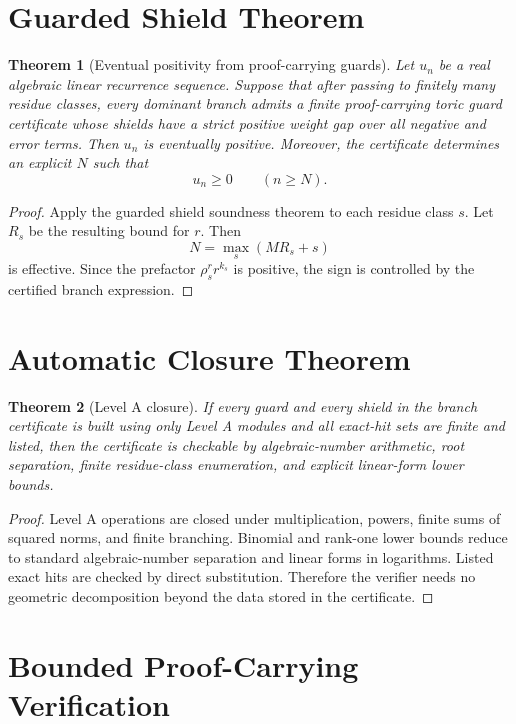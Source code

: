 \documentclass[11pt]{article}
\newtheorem{theorem}{Theorem}[section]
\begin{document}
\section{Guarded Shield Theorem}

\begin{theorem}[Eventual positivity from proof-carrying guards]
Let \(u_n\) be a real algebraic linear recurrence sequence. Suppose that after passing to finitely many residue classes, every dominant branch admits a finite proof-carrying toric guard certificate whose shields have a strict positive weight gap over all negative and error terms. Then \(u_n\) is eventually positive. Moreover, the certificate determines an explicit \(N\) such that
\[
u_n\ge0
\qquad(n\ge N).
\]
\end{theorem}

\begin{proof}
Apply the guarded shield soundness theorem to each residue class \(s\). Let \(R_s\) be the resulting bound for \(r\). Then
\[
N=\max_s(MR_s+s)
\]
is effective. Since the prefactor \(\rho_s^r r^{k_s}\) is positive, the sign is controlled by the certified branch expression.
\end{proof}

\section{Automatic Closure Theorem}

\begin{theorem}[Level A closure]
If every guard and every shield in the branch certificate is built using only Level A modules and all exact-hit sets are finite and listed, then the certificate is checkable by algebraic-number arithmetic, root separation, finite residue-class enumeration, and explicit linear-form lower bounds.
\end{theorem}

\begin{proof}
Level A operations are closed under multiplication, powers, finite sums of squared norms, and finite branching. Binomial and rank-one lower bounds reduce to standard algebraic-number separation and linear forms in logarithms. Listed exact hits are checked by direct substitution. Therefore the verifier needs no geometric decomposition beyond the data stored in the certificate.
\end{proof}

\section{Bounded Proof-Carrying Verification}
\end{document}
